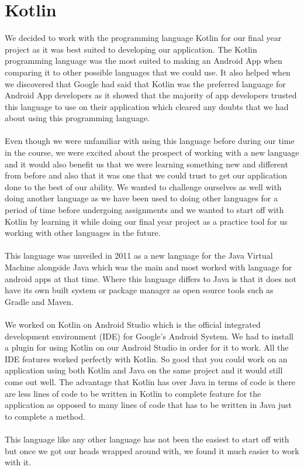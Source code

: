 \section{Kotlin}
We decided to work with the programming language Kotlin \cite{kotlin} for our final year project as it was best suited to developing our application. The Kotlin programming language was the most suited to making an Android App when comparing it to other possible languages that we could use. It also helped when we discovered that Google had said that Kotlin was the preferred language for Android App developers as it showed that the majority of app developers trusted this language to use on their application which cleared any doubts that we had about using this programming language.
\\
\\
 Even though we were unfamiliar with using this language before during our time in the course, we were excited about the prospect of working with a new language and it would also benefit us that we were learning something new and different from before and also that it was one that we could trust to get our application done to the best of our ability. We wanted to challenge ourselves as well with doing another language as we have been used to doing other languages for a period of time before undergoing assignments and we wanted to start off with Kotlin by learning it while doing our final year project as a practice tool for us working with other languages in the future.
 \\
 \\
This language was unveiled in 2011 as a new language for the Java Virtual Machine alongside Java which was the main and most worked with language for android apps at that time. Where this language differs to Java is that it does not have its own built system or package manager as open source tools such as Gradle and Maven.
\\
\\
We worked on Kotlin on Android Studio which is the official integrated development environment (IDE) for Google’s Android System. We had to install a plugin for using Kotlin on our Android Studio in order for it to work. All the IDE features worked perfectly with Kotlin. So good that you could work on an application using both Kotlin and Java on the same project and it would still come out well. The advantage that Kotlin has over Java in terms of code is there are less lines of code to be written in Kotlin to complete feature for the application as opposed to many lines of code that has to be written in Java just to complete a method.
\\
\\
This language like any other language has not been the easiest to start off with but once we got our heads wrapped around with, we found it much easier to work with it.
\\
